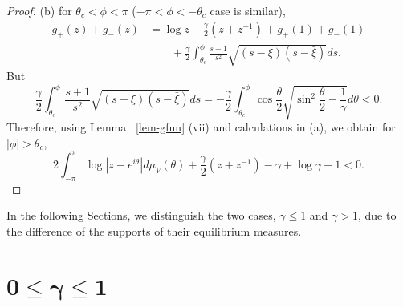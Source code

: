 \documentclass{amsart}
\theoremstyle{definition}
\theoremstyle{remark}
\numberwithin{equation}{section}
\begin{document}
\begin{proof}
  (b) for $\theta_c <\phi <\pi$ ($-\pi <\phi <-\theta_c$ case is similar),
  \begin{equation*}
    \begin{split}
      g_+(z)+g_-(z)&= \log{z} -\frac{\gamma}2(z+z^{-1}) +g_+(1)+g_-(1)\\
      &\qquad +\frac{\gamma}2 \int_{\theta_c}^{\phi} \frac{s+1}{s^2}\sqrt{(s-\xi)(s-\bar{\xi})} ds.
    \end{split}
  \end{equation*}
  But 
$$\frac{\gamma}2 \int_{\theta_c}^{\phi} \frac{s+1}{s^2}\sqrt{(s-\xi)(s-\bar{\xi})} ds = -\frac{\gamma}2 \int_{\theta_c}^{\phi} \cos{\frac{\theta}2} \sqrt{\sin^2 \frac{\theta}2 -\frac1{\gamma}} d\theta < 0.$$
  Therefore, using Lemma ~\ref{lem-gfun} (vii) and 
calculations in (a), we obtain for $|\phi|>\theta_c$,
  \begin{equation*}
    2\int_{-\pi}^{\pi}\log |z-e^{i\theta}| d\mu_V(\theta)
+ \frac{\gamma}2(z+z^{-1}) -\gamma +\log\gamma +1 <0.
  \end{equation*}
\end{proof}

In the following Sections, we distinguish the two cases, 
$\gamma\le1$ and $\gamma>1$, 
due to the difference of the supports of their equilibrium measures.



\section{$\mathbf{ 0\leq \gamma \le 1}$}
\label{s-K1}
\end{document}
